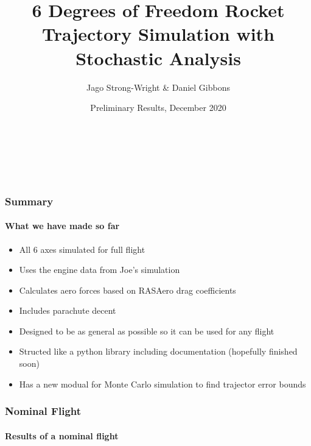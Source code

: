 \documentclass{beamer}
\title[6DOF Trajectory Simulation: Preliminary Results]{6 Degrees of Freedom Rocket Trajectory Simulation with Stochastic Analysis} %
\author%
{Jago Strong-Wright \& Daniel Gibbons
}
\institute%
{%
    \textit{}\\
    \textit{}
}
\date[Dec 2020]{Preliminary Results, December 2020} %
\begin{document}
    \begin{frame}
        \begin{titlepage}
                {\inserttitle\\[0.9cm]}
                {\insertauthor\par}
                {\insertinstitute\\[0.3cm]}
                {\insertdate}
        \end{titlepage}
    \end{frame}
    \begin{frame}
        \frametitle{Summary}
        \framesubtitle{What we have made so far}

        \begin{itemize}
            \item All 6 axes simulated for full flight
            \item Uses the engine data from Joe's simulation 
            \item Calculates aero forces based on RASAero drag coefficients
            \item Includes parachute decent
            \item Designed to be as general as possible so it can be used for any flight
            \item Structed like a python library including documentation (hopefully finished soon)
            \item Has a new modual for Monte Carlo simulation to find trajector error bounds
        \end{itemize}

    \end{frame}
    \begin{frame}
        \frametitle{Nominal Flight}
        \framesubtitle{Results of a nominal flight}
        
    \end{frame}
\end{document}
